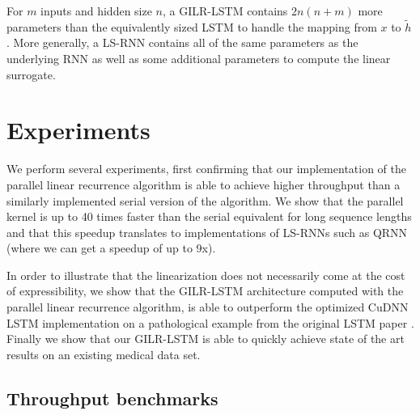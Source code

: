 \documentclass{article}
\begin{document}
For $m$ inputs and hidden size $n$, a GILR-LSTM contains $2n(n+m)$ more
parameters than the equivalently sized LSTM to handle the mapping from $x$ to
$\tilde{h}$. More generally, a LS-RNN contains all of the same parameters as the
underlying RNN as well as some additional parameters to compute the linear
surrogate.

\section{Experiments}
We perform several experiments, first confirming that our implementation of the
parallel linear recurrence algorithm is able to achieve higher throughput than a
similarly implemented serial version of the algorithm. We show that the parallel kernel
is up to 40 times faster than the serial equivalent for long sequence lengths and
that this speedup translates to implementations of LS-RNNs such as QRNN (where
we can get a speedup of up to 9x).

In order to illustrate that the linearization does not necessarily come at the
cost of expressibility, we show that the GILR-LSTM architecture computed with
the parallel linear recurrence algorithm, is able to outperform the optimized CuDNN LSTM
implementation
on a pathological example from the original LSTM paper
\cite{hochreiter1997long}. Finally we show that our GILR-LSTM is able to
quickly achieve state of the art results on an existing medical data
set. 

\subsection{Throughput benchmarks}
\end{document}
